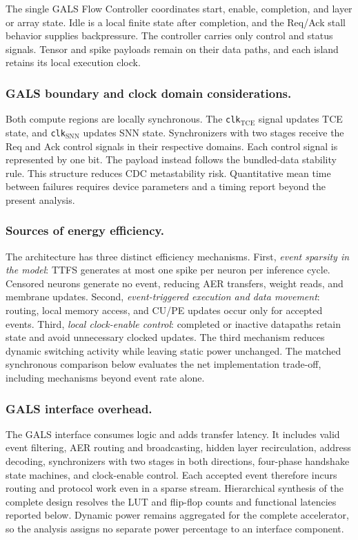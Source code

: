 ﻿\documentclass[12pt]{article}
\begin{document}
The single GALS Flow Controller coordinates start, enable, completion, and layer or array state. Idle is a local finite state after completion, and the Req/Ack stall behavior supplies backpressure. The controller carries only control and status signals. Tensor and spike payloads remain on their data paths, and each island retains its local execution clock.

\subsubsection*{GALS boundary and clock domain considerations.}
Both compute regions are locally synchronous. The \texttt{clk}$_{\mathrm{TCE}}$ signal updates TCE state, and \texttt{clk}$_{\mathrm{SNN}}$ updates SNN state. Synchronizers with two stages receive the Req and Ack control signals in their respective domains. Each control signal is represented by one bit. The payload instead follows the bundled-data stability rule. This structure reduces CDC metastability risk. Quantitative mean time between failures requires device parameters and a timing report beyond the present analysis.

\subsubsection*{Sources of energy efficiency.}
The architecture has three distinct efficiency mechanisms. First, \emph{event sparsity in the model}: TTFS generates at most one spike per neuron per inference cycle. Censored neurons generate no event, reducing AER transfers, weight reads, and membrane updates. Second, \emph{event-triggered execution and data movement}: routing, local memory access, and CU/PE updates occur only for accepted events. Third, \emph{local clock-enable control}: completed or inactive datapaths retain state and avoid unnecessary clocked updates. The third mechanism reduces dynamic switching activity while leaving static power unchanged. The matched synchronous comparison below evaluates the net implementation trade-off, including mechanisms beyond event rate alone.

\subsubsection*{GALS interface overhead.}
The GALS interface consumes logic and adds transfer latency. It includes valid event filtering, AER routing and broadcasting, hidden layer recirculation, address decoding, synchronizers with two stages in both directions, four-phase handshake state machines, and clock-enable control. Each accepted event therefore incurs routing and protocol work even in a sparse stream. Hierarchical synthesis of the complete design resolves the LUT and flip-flop counts and functional latencies reported below. Dynamic power remains aggregated for the complete accelerator, so the analysis assigns no separate power percentage to an interface component.
\end{document}
